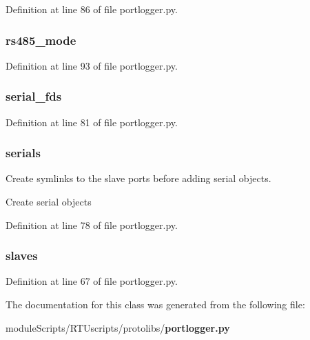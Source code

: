 Definition at line 86 of file portlogger.\+py.

\subsubsection[{rs485\+\_\+mode}]{\setlength{\rightskip}{0pt plus 5cm}rs485\+\_\+mode}\label{classprotolibs_1_1portlogger_1_1_port_logger_a58e98664214ef8977e835bbb0b362163}


Definition at line 93 of file portlogger.\+py.

\subsubsection[{serial\+\_\+fds}]{\setlength{\rightskip}{0pt plus 5cm}serial\+\_\+fds}\label{classprotolibs_1_1portlogger_1_1_port_logger_a3211d8c4cc00edcaa976ffe3d2b8109b}


Definition at line 81 of file portlogger.\+py.

\subsubsection[{serials}]{\setlength{\rightskip}{0pt plus 5cm}serials}\label{classprotolibs_1_1portlogger_1_1_port_logger_adc8dcf7657b529e1a22f77ff4aecf1e1}


Create symlinks to the slave ports before adding serial objects. 

Create serial objects 

Definition at line 78 of file portlogger.\+py.

\subsubsection[{slaves}]{\setlength{\rightskip}{0pt plus 5cm}slaves}\label{classprotolibs_1_1portlogger_1_1_port_logger_a174036b7e2519cf244f2fd065b54b082}


Definition at line 67 of file portlogger.\+py.



The documentation for this class was generated from the following file\+:\begin{DoxyCompactItemize}
\item 
module\+Scripts/\+R\+T\+Uscripts/protolibs/{\bf portlogger.\+py}\end{DoxyCompactItemize}
